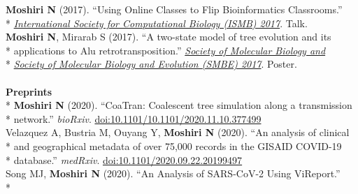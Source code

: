 \documentclass[margin,line]{res}
\begin{document}
\begin{resume}
\hspace*{4mm} \textbf{Moshiri N} (2017). ``Using Online Classes to Flip Bioinformatics Classrooms.''\\*\vspace{2mm}
\hspace*{8mm} \href{https://www.iscb.org/cms_addon/conferences/ismbeccb2017/technologytrack.php}{\textit{International Society for Computational Biology (ISMB) 2017}}. Talk.\\
\hspace*{4mm} \textbf{Moshiri N}, Mirarab S (2017). ``A two-state model of tree evolution and its\\*
\hspace*{9mm} applications to Alu retrotransposition.'' \href{https://smbe.org/smbe/}{\textit{Society of Molecular Biology and}}\\*\vspace{2mm}
\hspace*{8mm} \href{https://smbe.org/smbe/}{\textit{Society of Molecular Biology and Evolution (SMBE) 2017}}. Poster.\\
~\\
\textbf{Preprints}\vspace{2mm}\\*
\hspace*{4mm} \textbf{Moshiri N} (2020). ``CoaTran: Coalescent tree simulation along a transmission\\*\vspace{2mm}
\hspace*{8mm} network.'' \textit{bioRxiv}. \href{https://doi.org/10.1101/10.1101/2020.11.10.377499}{doi:10.1101/10.1101/2020.11.10.377499}\\
\hspace*{4mm} Velazquez A, Bustria M, Ouyang Y, \textbf{Moshiri N} (2020). ``An analysis of clinical\\*
\hspace*{9mm} and geographical metadata of over 75,000 records in the GISAID COVID-19\\*\vspace{2mm}
\hspace*{8mm} database.'' \textit{medRxiv}. \href{https://doi.org/10.1101/2020.09.22.20199497}{doi:10.1101/2020.09.22.20199497}\\
\hspace*{4mm} Song MJ, \textbf{Moshiri N} (2020). ``An Analysis of SARS-CoV-2 Using ViReport.''\\*\vspace{2mm}

\end{resume}
\end{document}
